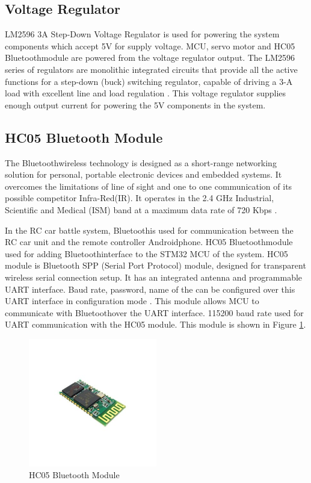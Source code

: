 \subsection{Voltage Regulator}
LM2596 3A Step-Down Voltage Regulator is used for powering the system components which accept 5V for supply voltage. MCU, servo motor and HC05 Bluetooth\texttrademark\;module are powered from the voltage regulator output. The LM2596 series of regulators are monolithic
integrated circuits that provide all the active functions for a step-down (buck) switching regulator, capable of driving a 3-A load with excellent line and load
regulation \cite{Three}. This voltage regulator supplies enough output current for powering the 5V components in the system.

\subsection{HC05 Bluetooth Module} \label{sec_hc05_module}
The Bluetooth\texttrademark\;wireless technology is designed as a short-range networking solution for personal, portable electronic devices and embedded systems. It overcomes the limitations of line of sight and one to one communication of its possible competitor Infra-Red(IR). It operates in the 2.4 GHz Industrial, Scientific and Medical (ISM) band at a maximum data rate of 720 Kbps \cite{Bluetooth_Overview}.

In the RC car battle system, Bluetooth\texttrademark\;is used for communication between the RC car unit and the remote controller Android\texttrademark\;phone. HC05 Bluetooth\texttrademark\;module used for adding Bluetooth\texttrademark\;interface to the STM32 MCU of the system. HC05 module is Bluetooth SPP (Serial Port Protocol) module, designed for transparent wireless serial connection setup. It has an integrated antenna and programmable UART interface. Baud rate, password, name of the can be configured over this UART interface in configuration mode \cite{HC05_datasheet}. This module allows MCU to communicate with Bluetooth\texttrademark\;over the UART interface. 115200 baud rate used for UART communication with the HC05 module. This module is shown in Figure \ref{fig:hc05_module}. 

\begin{figure}[!htbp]
    \centering
    \includegraphics[width=0.5\textwidth]{Imgs/400px-HC-05.jpg}
    \caption{\label{fig:hc05_module}HC05 Bluetooth\texttrademark\; Module \cite{HC05_datasheet}}
\end{figure}

